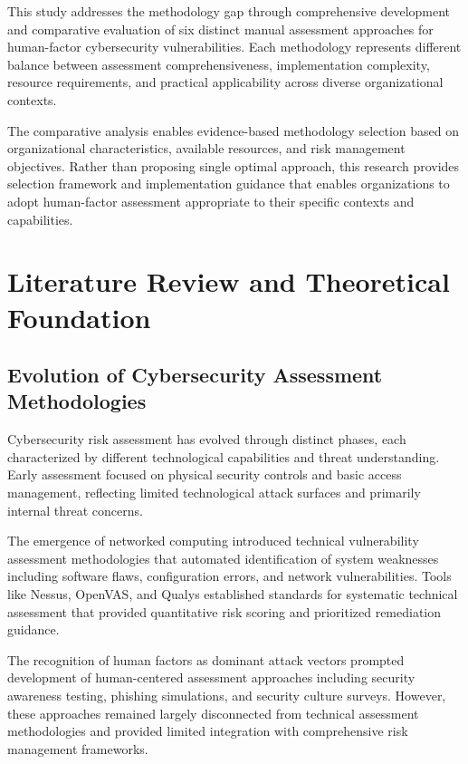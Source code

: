 \documentclass[10pt, twocolumn]{article}
\begin{document}
This study addresses the methodology gap through comprehensive development and comparative evaluation of six distinct manual assessment approaches for human-factor cybersecurity vulnerabilities. Each methodology represents different balance between assessment comprehensiveness, implementation complexity, resource requirements, and practical applicability across diverse organizational contexts.

The comparative analysis enables evidence-based methodology selection based on organizational characteristics, available resources, and risk management objectives. Rather than proposing single optimal approach, this research provides selection framework and implementation guidance that enables organizations to adopt human-factor assessment appropriate to their specific contexts and capabilities.

\section{Literature Review and Theoretical Foundation}

\subsection{Evolution of Cybersecurity Assessment Methodologies}

Cybersecurity risk assessment has evolved through distinct phases, each characterized by different technological capabilities and threat understanding. Early assessment focused on physical security controls and basic access management, reflecting limited technological attack surfaces and primarily internal threat concerns.

The emergence of networked computing introduced technical vulnerability assessment methodologies that automated identification of system weaknesses including software flaws, configuration errors, and network vulnerabilities. Tools like Nessus, OpenVAS, and Qualys established standards for systematic technical assessment that provided quantitative risk scoring and prioritized remediation guidance.

The recognition of human factors as dominant attack vectors prompted development of human-centered assessment approaches including security awareness testing, phishing simulations, and security culture surveys. However, these approaches remained largely disconnected from technical assessment methodologies and provided limited integration with comprehensive risk management frameworks.
\end{document}
